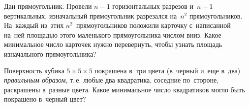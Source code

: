 \begin{problems}

\item
Дан прямоугольник.
Провели $n - 1$ горизонтальных разрезов и~$n - 1$ вертикальных, изначальный
прямоугольник разрезался на~$n^2$ прямоугольников.
На~каждый из~этих $n^2$~прямоугольников положили карточку с~написанной на~ней
площадью этого маленького прямоугольника числом вниз.
Какое минимальное число карточек нужно перевернуть, чтобы узнать площадь
изначального прямоугольника?


\item
Поверхность кубика $5 \times 5 \times 5$ покрашена в~три цвета (в~черный и~еще
в~два) \emph{правильным образом}, т.\,е. любые два квадратика, соседние
по~стороне, раскрашены в~разные цвета.
Какое минимальное число квадратиков могло быть покрашено в~черный цвет?



\end{problems}

